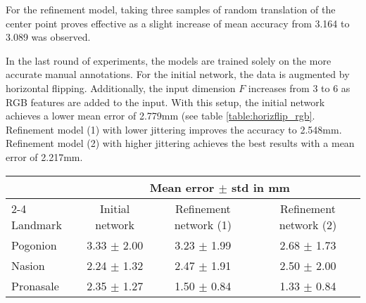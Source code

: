 \documentclass[class=article, crop=false]{standalone}
\begin{document}
For the refinement model, taking three samples of random translation of the center point proves effective as a slight increase of mean accuracy from 3.164 to 3.089 was observed.

In the last round of experiments, the models are trained solely on the more accurate manual annotations. For the initial network, the data is augmented by horizontal flipping. Additionally, the input dimension $F$ increases from 3 to 6 as RGB features are added to the input. With this setup, the initial network achieves a lower mean error of 2.779mm (see table \ref{table:horizflip_rgb}. Refinement model (1) with lower jittering improves the accuracy to 2.548mm. Refinement model (2) with higher jittering achieves the best results with a mean error of 2.217mm.

\begin{table*}[!htbp]
\label{table:horizflip_rgb}
\begin{tabularx}{\textwidth}{l|c|c|c}
\toprule
 & \multicolumn{3}{c}{Mean error $\pm$ std in mm} \\\cmidrule(lr){2-4}
Landmark               & \hspace{0.5cm}Initial network\hspace{0.5cm} &  \hspace{0.5cm}Refinement network (1)   \hspace{0.5cm} & \hspace{0.5cm} Refinement network (2)  \hspace{0.5cm}
\\
\midrule
Pogonion               & 3.33 $\pm$ 2.00 & 3.23 $\pm$ 1.99 & 2.68 $\pm$ 1.73 \\
Nasion                 & 2.24 $\pm$ 1.32 & 2.47 $\pm$ 1.91 & 2.50 $\pm$ 2.00\\  
Pronasale              & 2.35 $\pm$ 1.27 & 1.50 $\pm$ 0.84 & 1.33 $\pm$ 0.84\\

\end{tabularx}
\end{table*}
\end{document}

